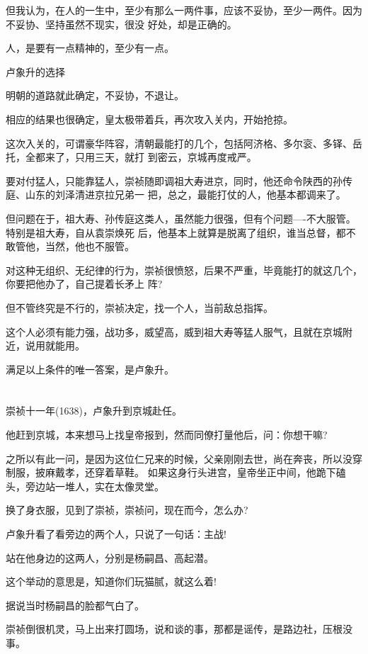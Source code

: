 \documentclass[11pt,a4paper,onecolumn]{article}
\begin{document}
但我认为，在人的一生中，至少有那么一两件事，应该不妥协，至少一两件。因为不妥协、坚持虽然不现实，很没
好处，却是正确的。

人，是要有一点精神的，至少有一点。

卢象升的选择

明朝的道路就此确定，不妥协，不退让。

相应的结果也很确定，皇太极带着兵，再次攻入关内，开始抢掠。

这次入关的，可谓豪华阵容，清朝最能打的几个，包括阿济格、多尔衮、多铎、岳托，全都来了，只用三天，就打
到密云，京城再度戒严。

要对付猛人，只能靠猛人，崇祯随即调祖大寿进京，同时，他还命令陕西的孙传庭、山东的刘泽清进京拉兄弟一
把，总之，最能打仗的人，他基本都调来了。

但问题在于，祖大寿、孙传庭这类人，虽然能力很强，但有个问题----不大服管。特别是祖大寿，自从袁崇焕死
后，他基本上就算是脱离了组织，谁当总督，都不敢管他，当然，他也不服管。

对这种无组织、无纪律的行为，崇祯很愤怒，后果不严重，毕竟能打的就这几个，你要把他办了，自己提着长矛上
阵?

但不管终究是不行的，崇祯决定，找一个人，当前敌总指挥。

这个人必须有能力强，战功多，威望高，威到祖大寿等猛人服气，且就在京城附近，说用就能用。

满足以上条件的唯一答案，是卢象升。

\section[\thesection]{}

崇祯十一年(1638)，卢象升到京城赴任。

他赶到京城，本来想马上找皇帝报到，然而同僚打量他后，问：你想干嘛?

之所以有此一问，是因为这位仁兄来的时候，父亲刚刚去世，尚在奔丧，所以没穿制服，披麻戴孝，还穿着草鞋。
如果这身行头进宫，皇帝坐正中间，他跪下磕头，旁边站一堆人，实在太像灵堂。

换了身衣服，见到了崇祯，崇祯问，现在而今，怎么办?

卢象升看了看旁边的两个人，只说了一句话：主战!

站在他身边的这两人，分别是杨嗣昌、高起潜。

这个举动的意思是，知道你们玩猫腻，就这么着!

据说当时杨嗣昌的脸都气白了。

崇祯倒很机灵，马上出来打圆场，说和谈的事，那都是谣传，是路边社，压根没事。
\end{document}
